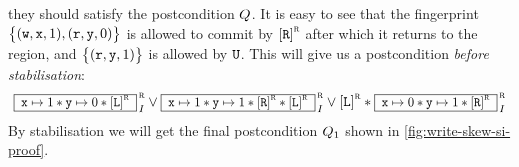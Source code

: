 






they should satisfy the postcondition \( Q \).
It is easy to see that
the fingerprint \( \Set{(\otW, \vx, 1), (\otR, \vy, 0)} \) is allowed to commit 
by \( \cass{\CB{R}}{\lrid} \) after which it returns to the region,
and \( \Set{(\otR, \vy, 1)} \) is allowed by \( \texttt{U} \).
This will give us a postcondition \emph{before stabilisation}:
\[
\boxass{ \vx \pt 1 \sep \vy \pt 0 \sep \cass{\CB{L}}{\lrid} }{\lrid}{\intass} 
\lor \boxass{\vx \pt 1 \sep \vy \pt 1  \sep \cass{\CB{R}}{\lrid} \sep \cass{\CB{L}}{\lrid} }{\lrid}{\intass}
\lor \cass{\CB{L}}{\lrid} \sep \boxass{\vx \pt 0 \sep \vy \pt 1 \sep \cass{\CB{R}}{\lrid} }{\lrid}{\intass} 
\]
By stabilisation we will get the final postcondition \( Q_1 \) shown in \cref{fig:write-skew-si-proof}.


